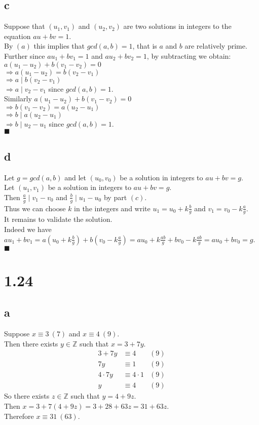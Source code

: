 \documentclass[letterpaper,12pt,oneside,onecolumn]{report}
\begin{document}
\subsection*{c}
Suppose that $(u_1,v_1)$ and $(u_2,v_2)$ are two solutions in integers to the equation $au + bv = 1$.\\
By $(a)$ this implies that $gcd(a,b) = 1$, that is $a$ and $b$ are relatively prime.\\
Further since $au_1 + bv_1 = 1$ and $au_2 + bv_2 = 1$, by subtracting we obtain:\\
$a(u_1-u_2) + b(v_1-v_2) = 0$\\
$\Rightarrow a(u_1-u_2) = b(v_2-v_1)$\\
$\Rightarrow a \mid b(v_2-v_1)$\\
$\Rightarrow a \mid v_2 - v_1$ since $gcd(a,b) = 1$.\\
Similarly $a(u_1-u_2) + b(v_1-v_2) = 0$\\
$\Rightarrow b(v_1-v_2) = a(u_2-u_1)$\\
$\Rightarrow b \mid a(u_2-u_1)$\\
$\Rightarrow b \mid u_2 - u_1$ since $gcd(a,b) = 1$.\\ $\blacksquare$
\subsection*{d}
Let $g = gcd(a,b)$ and let $(u_0, v_0)$ be a solution in integers to $au + bv = g$.\\
Let $(u_1, v_1)$ be a solution in integers to $au + bv = g$.\\
Then $\frac{a}{g} \mid v_1-v_0$ and $\frac{b}{g} \mid u_1-u_0$ by part $(c)$.\\
Thus we can choose $k$ in the integers and write $u_1 = u_0 + k\frac{b}{g}$ and $v_1 = v_0 - k \frac{a}{g}$.\\
It remains to validate the solution.\\
Indeed we have $au_1 + bv_1 = a(u_0 + k \frac{b}{g}) + b(v_0 - k\frac{a}{g}) = au_0 + k \frac{ab}{g} + bv_0 - k\frac{ab}{g} = au_0 + bv_0 = g$.$\blacksquare$  
\section*{1.24}
\subsection*{a}
Suppose $x \equiv 3\ (7)$ and $x \equiv 4\ (9)$.\\
Then there exists $y \in \mathbb{Z}$ such that $x = 3 + 7y$.
\begin{align*}
3 + 7y &\equiv 4 &(9)\\
7y &\equiv 1 &(9)\\
4 \cdot 7y &\equiv 4 \cdot 1 &(9)\\
y &\equiv 4 &(9)
\end{align*}
So there exists $z \in \mathbb{Z}$ such that $y = 4 + 9z$.\\
Then $x = 3 + 7(4 + 9z) = 3 + 28 + 63z = 31 + 63z$.\\
Therefore $x \equiv 31\ (63)$.
\end{document}
